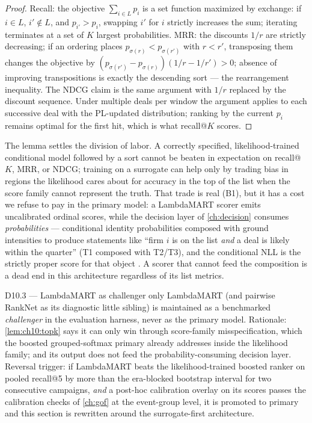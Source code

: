 \begin{proof}
Recall: the objective $\sum_{i \in L} p_i$ is a set function maximized by
exchange: if $i \in L$, $i' \notin L$, and $p_{i'} > p_i$, swapping $i'$
for $i$ strictly increases the sum; iterating terminates at a set of $K$
largest probabilities. MRR: the discounts $1/r$ are strictly decreasing;
if an ordering places $p_{\sigma(r)} < p_{\sigma(r')}$ with $r < r'$,
transposing them changes the objective by $(p_{\sigma(r')} -
p_{\sigma(r)})(1/r - 1/r') > 0$; absence of improving transpositions is
exactly the descending sort --- the rearrangement inequality. The NDCG
claim is the same argument with $1/r$ replaced by the discount sequence.
Under multiple deals per window the argument applies to each successive
deal with the PL-updated distribution; ranking by the current $p_i$
remains optimal for the first hit, which is what recall@$K$ scores.
\end{proof}

The lemma settles the division of labor. A correctly specified,
likelihood-trained conditional model followed by a sort cannot be beaten
in expectation on recall@$K$, MRR, or NDCG; training on a surrogate can
help only by trading bias in regions the likelihood cares about for
accuracy in the top of the list when the score family cannot represent
the truth. That trade is real (B1), but it has a cost we refuse to pay in
the primary model: a LambdaMART scorer emits uncalibrated ordinal scores,
while the decision layer of \cref{ch:decision} consumes \emph{probabilities}
--- conditional identity probabilities composed with ground intensities
to produce statements like ``firm $i$ is on the list \emph{and} a deal is
likely within the quarter'' (T1 composed with T2/T3), and the conditional
NLL is the strictly proper score for that object
\citep{gneitingraftery2007}. A scorer that cannot feed the composition is
a dead end in this architecture regardless of its list metrics.

\begin{decision}{D10.3 --- LambdaMART as challenger only}
LambdaMART (and pairwise RankNet as its diagnostic little sibling) is
maintained as a benchmarked \emph{challenger} in the evaluation harness,
never as the primary model. Rationale: \cref{lem:ch10:topk} says it can
only win through score-family misspecification, which the boosted
grouped-softmax primary already addresses inside the likelihood family;
and its output does not feed the probability-consuming decision layer.
Reversal trigger: if LambdaMART beats the likelihood-trained boosted
ranker on pooled recall@5 by more than the era-blocked bootstrap interval
for two consecutive campaigns, \emph{and} a post-hoc calibration overlay
\citep{platt1999,zadroznyelkan2002,niculescumizil2005} on its scores
passes the calibration checks of \cref{ch:gof} at the event-group level,
it is promoted to primary and this section is rewritten around the
surrogate-first architecture.
\end{decision}

